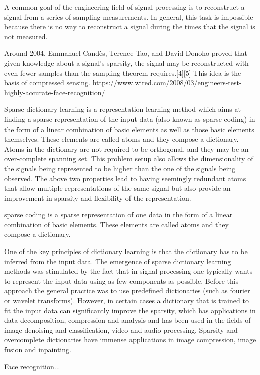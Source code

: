 A common goal of the engineering field of signal processing is to reconstruct a signal from a series of sampling measurements. In general, this task is impossible because there is no way to reconstruct a signal during the times that the signal is not measured.

Around 2004, Emmanuel Candès, Terence Tao, and David Donoho proved that given knowledge about a signal's sparsity, the signal may be reconstructed with even fewer samples than the sampling theorem requires.[4][5] This idea is the basis of compressed sensing. 	https://www.wired.com/2008/03/engineers-test-highly-accurate-face-recognition/

Sparse dictionary learning is a representation learning method which aims at finding a sparse representation of the input data (also known as sparse coding) in the form of a linear combination of basic elements as well as those basic elements themselves. These elements are called atoms and they compose a dictionary. Atoms in the dictionary are not required to be orthogonal, and they may be an over-complete spanning set. This problem setup also allows the dimensionality of the signals being represented to be higher than the one of the signals being observed. The above two properties lead to having seemingly redundant atoms that allow multiple representations of the same signal but also provide an improvement in sparsity and flexibility of the representation.

sparse coding is a sparse representation of one data in the form of a linear combination of basic elements. These elements are called atoms and they compose a dictionary.

One of the key principles of dictionary learning is that the dictionary has to be inferred from the input data. The emergence of sparse dictionary learning methods was stimulated by the fact that in signal processing one typically wants to represent the input data using as few components as possible. Before this approach the general practice was to use predefined dictionaries (such as fourier or wavelet transforms). However, in certain cases a dictionary that is trained to fit the input data can significantly improve the sparsity, which has applications in data decomposition, compression and analysis and has been used in the fields of image denoising and classification, video and audio processing. Sparsity and overcomplete dictionaries have immense applications in image compression, image fusion and inpainting.

Face recognition...

